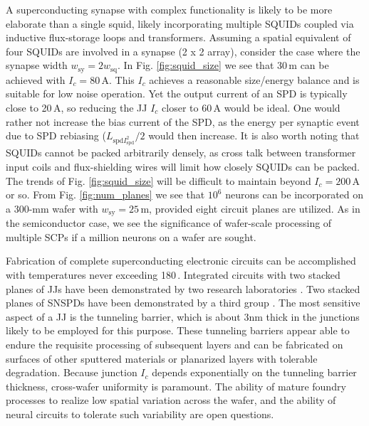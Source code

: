 \documentclass[twocolumn]{article}
\begin{document}
A superconducting synapse with complex functionality is likely to be more elaborate than a single squid, likely incorporating multiple SQUIDs coupled via inductive flux-storage loops and transformers. Assuming a spatial equivalent of four SQUIDs are involved in a synapse (2 x 2 array), consider the case where the synapse width $w_{\mathrm{sy}} = 2w_{\mathrm{sq}}$. In Fig. \ref{fig:squid_size} we see that 30\,\textmu m can be achieved with $I_c = 80$\,\textmu A. This $I_c$ achieves a reasonable size/energy balance and is suitable for low noise operation. Yet the output current of an SPD is typically close to 20\,\textmu A, so reducing the JJ $I_c$ closer to 60\,\textmu A would be ideal. One would rather not increase the bias current of the SPD, as the energy per synaptic event due to SPD rebiasing ($L_{\mathrm{spd}I_{\mathrm{spd}}^2}/2$ would then increase. It is also worth noting that SQUIDs cannot be packed arbitrarily densely, as cross talk between transformer input coils and flux-shielding wires will limit how closely SQUIDs can be packed. The trends of Fig. \ref{fig:squid_size} will be difficult to maintain beyond $I_c = 200$\,\textmu A or so. From Fig. \ref{fig:num_planes} we see that $10^6$ neurons can be incorporated on a 300-mm wafer with $w_{\mathrm{sy}} = 25$\,\textmu m, provided eight circuit planes are utilized. As in the semiconductor case, we see the significance of wafer-scale processing of multiple SCPs if a million neurons on a wafer are sought.

Fabrication of complete superconducting electronic circuits can be accomplished with temperatures never exceeding 180\,\textcelsius. Integrated circuits with two stacked planes of JJs have been demonstrated by two research laboratories \cite{tobo2019,anna2017}. Two stacked planes of SNSPDs have been demonstrated by a third group \cite{vema2012}. The most sensitive aspect of a JJ is the tunneling barrier, which is about 3nm thick in the junctions likely to be employed for this purpose. These tunneling barriers appear able to endure the requisite processing of subsequent layers and can be fabricated on surfaces of other sputtered materials or planarized layers with tolerable degradation. Because junction $I_c$ depends exponentially on the tunneling barrier thickness, cross-wafer uniformity is paramount. The ability of mature foundry processes to realize low spatial variation across the wafer, and the ability of neural circuits to tolerate such variability are open questions.
\end{document}
